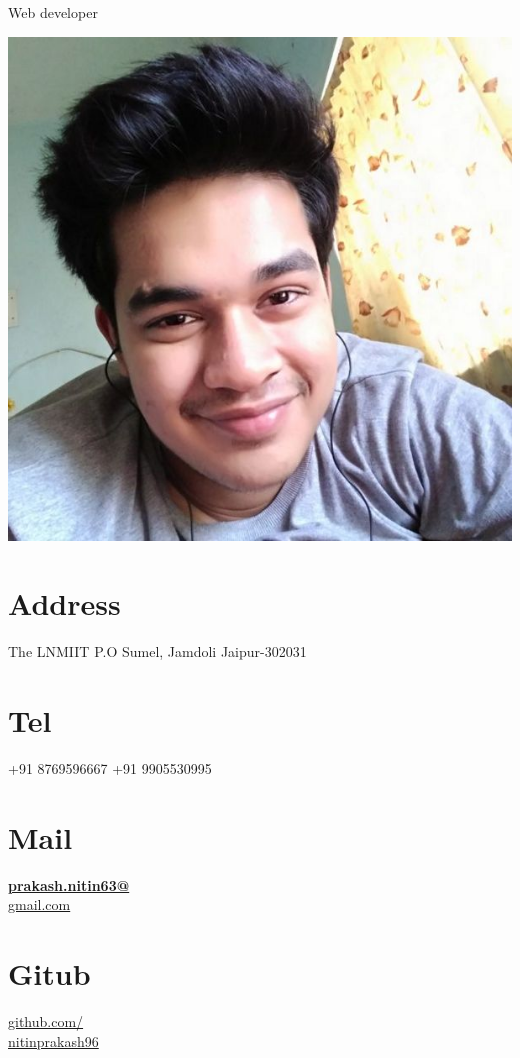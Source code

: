 \documentclass[]{friggeri-cv}
\begin{document}
      {Web developer}
      

\begin{aside}
  \includegraphics[scale=0.18]{img/dp.jpg}
  \section{Address}
    The LNMIIT
    P.O Sumel, Jamdoli
    Jaipur-302031
    ~
  \section{Tel}
    +91 8769596667
    +91 9905530995
    ~
  \section{Mail}
    \href{mailto: prakash.nitin63@gmail.com}{\textbf{prakash.nitin63@}\\gmail.com}
    ~
  \section{Gitub}
    \href{https://github.com/mygit}{github.com/\\nitinprakash96}
    ~

\end{aside}
\end{document}
